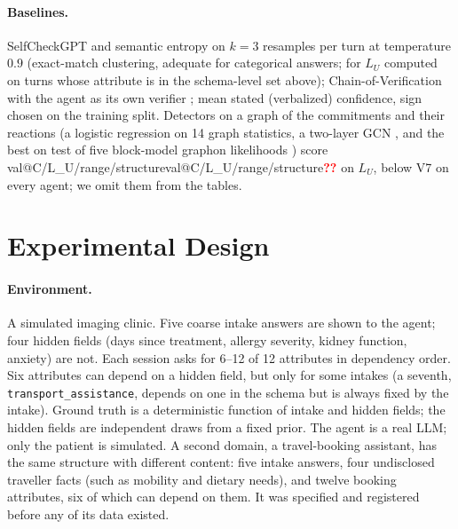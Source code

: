 \documentclass[10pt,a4paper,twocolumn]{article}
\makeatletter
\newcommand{\val}[1]{\ifcsname val@#1\endcsname\csname val@#1\endcsname\else\textcolor{red}{\textbf{??}}\fi}
\newcommand{\LU}{L_{U}}
\makeatother
\begin{document}
\paragraph{Baselines.} SelfCheckGPT and semantic entropy on $k=3$ resamples
per turn at temperature $0.9$ (exact-match clustering, adequate for
categorical answers; for $\LU$ computed on turns whose attribute is in the
schema-level set above);
Chain-of-Verification with the agent as its own verifier
\citep{dhuliawala2024cove}; mean stated (verbalized) confidence, sign
chosen on the training split. Detectors on a graph of the commitments and
their reactions (a logistic regression on 14 graph statistics, a two-layer
GCN \citep{kipf2017gcn}, and the best on test of five block-model graphon
likelihoods \citep{lovasz2012large}) score \val{C/L_U/range/structure} on
$\LU$, below V7 on every agent; we omit them from the tables.

\section{Experimental Design}
\label{sec:setup}

\paragraph{Environment.} A simulated imaging clinic. Five coarse intake
answers are shown to the agent; four hidden fields (days since treatment,
allergy severity, kidney function, anxiety) are not. Each session asks for
6--12 of 12 attributes in dependency order. Six attributes can depend on a hidden field, but only for some intakes (a seventh, \texttt{transport\_assistance}, depends on one in the schema but is always fixed by the intake). Ground truth is a deterministic function of intake and hidden
fields; the hidden fields are independent draws from a fixed prior. The
agent is a real LLM; only the patient is simulated. A second domain, a
travel-booking assistant, has the same structure with different content:
five intake answers, four undisclosed traveller facts (such as mobility and
dietary needs), and twelve booking attributes, six of which can depend on
them. It was specified and registered before
any of its data existed.
\end{document}
